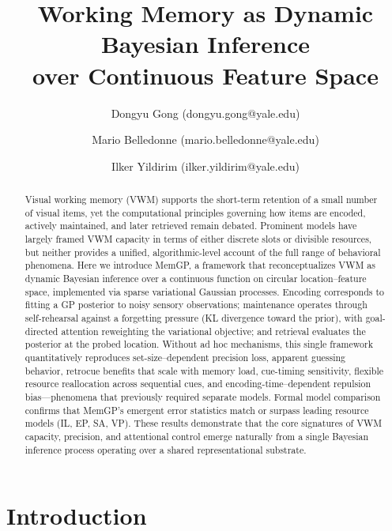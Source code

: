 \documentclass[11pt,letterpaper]{article}
\title{\textbf{Working Memory as Dynamic Bayesian Inference\\over Continuous Feature Space}}
\author[1]{Dongyu Gong (dongyu.gong@yale.edu)}
\author[1]{Mario Belledonne (mario.belledonne@yale.edu)}
\author[1,2]{Ilker Yildirim (ilker.yildirim@yale.edu)}
\affil[1]{Department of Psychology, Yale University}
\affil[2]{Wu Tsai Institute, Yale University}
\date{}
\begin{document}
\maketitle

\begin{abstract}
Visual working memory (VWM) supports the short-term retention of a small number of visual items, yet the computational principles governing how items are encoded, actively maintained, and later retrieved remain debated. Prominent models have largely framed VWM capacity in terms of either discrete slots or divisible resources, but neither provides a unified, algorithmic-level account of the full range of behavioral phenomena. Here we introduce MemGP, a framework that reconceptualizes VWM as dynamic Bayesian inference over a continuous function on circular location--feature space, implemented via sparse variational Gaussian processes. Encoding corresponds to fitting a GP posterior to noisy sensory observations; maintenance operates through self-rehearsal against a forgetting pressure (KL divergence toward the prior), with goal-directed attention reweighting the variational objective; and retrieval evaluates the posterior at the probed location. Without ad hoc mechanisms, this single framework quantitatively reproduces set-size--dependent precision loss, apparent guessing behavior, retrocue benefits that scale with memory load, cue-timing sensitivity, flexible resource reallocation across sequential cues, and encoding-time--dependent repulsion bias---phenomena that previously required separate models. Formal model comparison confirms that MemGP's emergent error statistics match or surpass leading resource models (IL, EP, SA, VP). These results demonstrate that the core signatures of VWM capacity, precision, and attentional control emerge naturally from a single Bayesian inference process operating over a shared representational substrate.
\end{abstract}

\section{Introduction}
\end{document}
